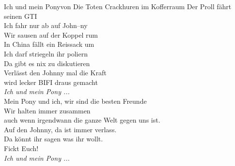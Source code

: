 \begin{lied*}{Ich und mein Pony}{von Die Toten Crackhuren im Kofferraum}
Der Proll fährt seinen GTI\\
Ich fahr nur ab auf John–ny\\
Wir sausen auf der Koppel rum\\
In China fällt ein Reissack um\\

Ich darf striegeln ihr poliern\\
Da gibt es nix zu diskutieren\\
Verlässt den Johnny mal die Kraft\\
wird lecker BIFI draus gemacht\\

\textit{Ich und mein Pony ...}\\

Mein Pony und ich, wir sind die besten Freunde\\
Wir halten immer zusammen\\
auch wenn irgendwann die ganze Welt gegen uns ist.\\
Auf den Johnny, da ist immer verlass.\\
Da könnt ihr sagen was ihr wollt.\\
Fickt Euch!\\

\textit{Ich und mein Pony ...}\\
\end{lied*}
